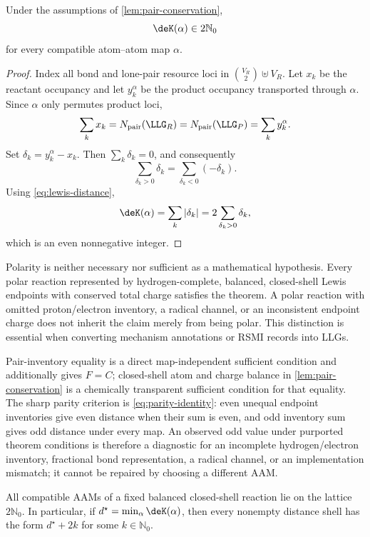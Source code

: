 \begin{theorem}
\label{thm:lewis-even}
Under the assumptions of \cref{lem:pair-conservation},
\[
  \deK(\alpha)\in2\mathbb N_0
\]
for every compatible atom--atom map $\alpha$.
\end{theorem}

\begin{proof}
Index all bond and lone-pair resource loci in
$\binom{V_R}{2}\uplus V_R$.  Let $x_k$ be the reactant occupancy and let
$y_k^\alpha$ be the product occupancy transported through $\alpha$.  Since
$\alpha$ only permutes product loci,
\[
  \sum_k x_k
  =N_{\mathrm{pair}}(\LLG_R)
  =N_{\mathrm{pair}}(\LLG_P)
  =\sum_k y_k^\alpha.
\]
Set $\delta_k=y_k^\alpha-x_k$.  Then $\sum_k\delta_k=0$, and consequently
\[
  \sum_{\delta_k>0}\delta_k
  =
  \sum_{\delta_k<0}(-\delta_k).
\]
Using \cref{eq:lewis-distance},
\[
  \deK(\alpha)
  =\sum_k|\delta_k|
  =2\sum_{\delta_k>0}\delta_k,
\]
which is an even nonnegative integer.
\end{proof}

Polarity is neither necessary nor sufficient as a mathematical hypothesis.
Every polar reaction represented by hydrogen-complete, balanced, closed-shell
Lewis endpoints with conserved total charge satisfies the theorem.  A polar
reaction with omitted proton/electron inventory, a radical channel, or an
inconsistent endpoint charge does not inherit the claim merely from being
polar.  This distinction is essential when converting mechanism annotations
or RSMI records into LLGs.

Pair-inventory equality is a direct map-independent sufficient condition and
additionally gives $F=C$; closed-shell atom and charge balance in
\cref{lem:pair-conservation} is a chemically transparent sufficient condition
for that equality.  The sharp parity criterion is
\cref{eq:parity-identity}: even unequal endpoint inventories give even
distance when their sum is even, and odd inventory sum gives odd distance
under every map.  An observed odd value under purported theorem conditions is
therefore a diagnostic for an incomplete hydrogen/electron inventory,
fractional bond representation, a radical channel, or an implementation
mismatch; it cannot be repaired by choosing a different AAM.

\begin{corollary}
\label{cor:distance-lattice}
All compatible AAMs of a fixed balanced closed-shell reaction lie on the
lattice $2\mathbb N_0$.  In particular, if
\(d^\star=\min_\alpha\deK(\alpha)\), then every nonempty distance
shell has the form \(d^\star+2k\) for some \(k\in\mathbb N_0\).
\end{corollary}

